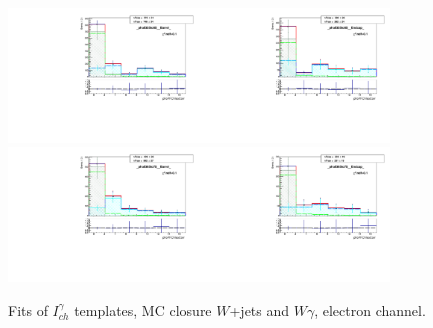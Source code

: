 \begin{figure}[htb]
\begin{center}
   \includegraphics[width=0.45\textwidth]{../figs/figs_v11/ELECTRON_WGamma/MCclosureWjetsPlusWg/c_TEMPL_CHISO_UNblind__phoEt55to65__Barrel__RooFit_MCclosure.pdf}\includegraphics[width=0.45\textwidth]{../figs/figs_v11/ELECTRON_WGamma/MCclosureWjetsPlusWg/c_TEMPL_CHISO_UNblind__phoEt55to65__Endcap__RooFit_MCclosure.pdf}\\
   \includegraphics[width=0.45\textwidth]{../figs/figs_v11/ELECTRON_WGamma/MCclosureWjetsPlusWg/c_TEMPL_CHISO_UNblind__phoEt65to75__Barrel__RooFit_MCclosure.pdf}\includegraphics[width=0.45\textwidth]{../figs/figs_v11/ELECTRON_WGamma/MCclosureWjetsPlusWg/c_TEMPL_CHISO_UNblind__phoEt65to75__Endcap__RooFit_MCclosure.pdf}\\
  \label{fig:templateFits_MCclosureWjetsPlusWg_CHISO_ELECTRON_2}
  \caption{Fits of $I_{ch}^{\gamma}$ templates, MC closure $W$+jets and $W\gamma$, electron channel.}
  \end{center}
\end{figure}

